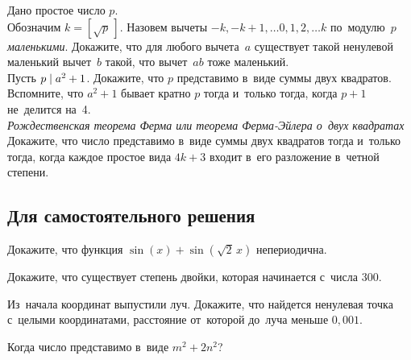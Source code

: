 \begin{problems}

\item
Дано простое число $p$.
\\
\subproblem
Обозначим $k = [\sqrt{p}\,]$.
Назовем вычеты $-k, -k+1, \ldots 0, 1, 2, \ldots k$ по~модулю~$p$
\emph{маленькими}.
Докажите, что для любого вычета~$a$ существует такой ненулевой маленький
вычет~$b$ такой, что вычет~$a b$ тоже маленький.
\\
\subproblem
Пусть $p \mathrel{\vert} a^2 + 1$.
Докажите, что $p$ представимо в~виде суммы двух квадратов.
\\
\subproblem
Вспомните, что $a^2 + 1$ бывает кратно $p$ тогда и~только тогда, когда $p + 1$
не~делится на~4.
\\
\subproblem
\emph{Рождественская теорема Ферма или теорема Ферма-Эйлера о~двух квадратах}
Докажите, что число представимо в~виде суммы двух квадратов тогда и~только
тогда, когда каждое простое вида $4 k + 3$ входит в~его разложение в~четной
степени.

\end{problems}

\subsection*{Для самостоятельного решения}

\begin{problems}

\item
Докажите, что функция $\sin(x) + \sin(\sqrt{2} \, x)$ непериодична.

\item
Докажите, что существует степень двойки, которая начинается с~числа $300$.

\item
Из~начала координат выпустили луч.
Докажите, что найдется ненулевая точка с~целыми координатами, расстояние
от~которой до~луча меньше $0{,}001$.

\item
Когда число представимо в~виде $m^2 + 2 n^2$?

\end{problems}

\endgroup %

